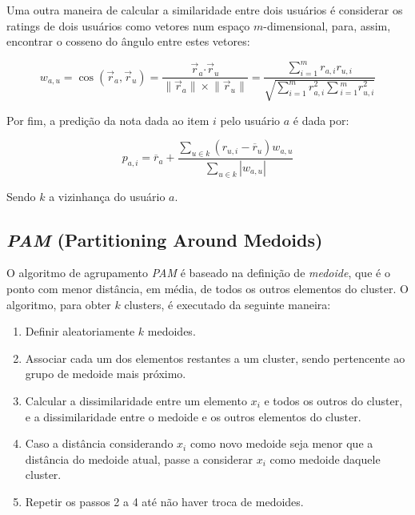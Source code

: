 \documentclass[12pt,a4paper,header]{abnt}
\begin{document}
Uma outra maneira de calcular a similaridade entre dois usuários é considerar os ratings de dois usuários como vetores num espaço $m$-dimensional, para, assim, encontrar o cosseno do ângulo entre estes vetores\cite{melville2011recommender}:

\begin{equation}
w_{a, u} = \cos({\vec{r}_a, \vec{r}_u}) = \frac{\vec{r}_a \boldsymbol{\cdot} \vec{r}_u}{\lVert \vec{r}_a\rVert \times \lVert \vec{r}_u\rVert} = \frac{\sum_{i=1}^{m}{r_{a, i} r_{u, i}}}{\sqrt{\sum_{i=1}^{m}{r^2_{a, i}} \sum{_{i=1}^{m}{r^2_{u, i}}}}}
\end{equation}

Por fim, a predição da nota dada ao item $i$ pelo usuário $a$ é dada por:

\begin{equation}
p_{a, i} = \overline{r}_a + \frac{\sum_{u \in k}{(r_{u, i} - \overline{r}_u) w_{a, u}}}{\sum_{u \in k}{\left|w_{a, u}\right|}}
\end{equation}

Sendo $k$ a vizinhança do usuário $a$.

\subsection{\textit{PAM} (Partitioning Around Medoids)}

O algoritmo de agrupamento \textit{PAM} é baseado na definição de \textit{medoide}, que é o ponto com menor distância, em média, de todos os outros elementos do cluster. O algoritmo, para obter $k$ clusters, é executado da seguinte maneira\cite{do2005agrupamentos}:

\begin{enumerate}

\item{Definir aleatoriamente $k$ medoides.}
\item{Associar cada um dos elementos restantes a um cluster, sendo pertencente ao grupo de medoide mais próximo.}
\item{Calcular a dissimilaridade entre um elemento $x_i$ e todos os outros do cluster, e a dissimilaridade entre o medoide e os outros elementos do cluster.}
\item{Caso a distância considerando $x_i$ como novo medoide seja menor que a distância do medoide atual, passe a considerar $x_i$ como medoide daquele cluster.}
\item{Repetir os passos 2 a 4 até não haver troca de medoides.}

\end{enumerate}
\end{document}
